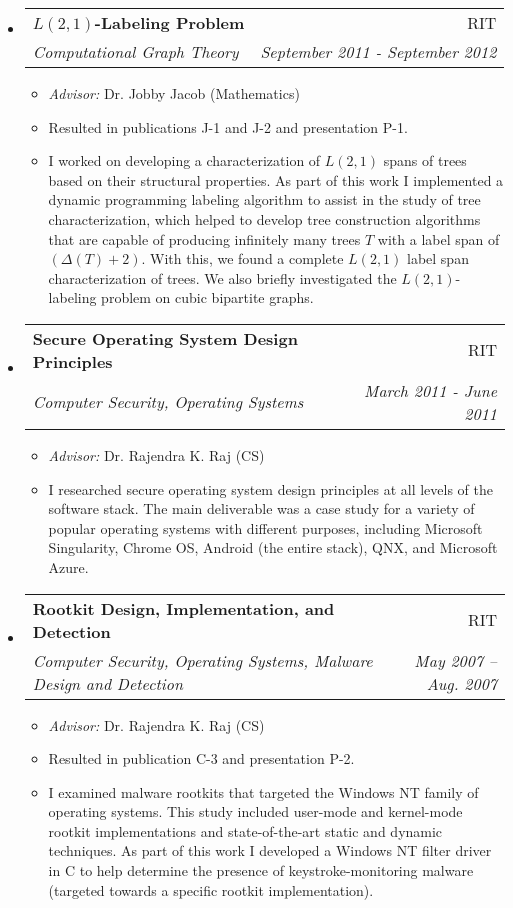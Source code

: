 \documentclass[letterpaper,11pt]{article}
\makeatletter
\newcommand{\resitem}[1]{\item #1 \vspace{-2pt}}
\newcommand{\ressubheading}[4]{
\begin{tabular*}{6.5in}[t]{l@{\cftdotfill{\cftsecdotsep}\extracolsep{\fill}}r}
		\textbf{#1} & #2 \\
		\textit{#3} & \textit{#4} \\
\end{tabular*}\vspace{-6pt}}
\makeatother
\begin{document}
\begin{itemize}
\item
	\ressubheading{$L(2,1)$-Labeling Problem}{RIT}{Computational Graph Theory}{September 2011 - September 2012}
	\begin{itemize}
		\resitem{\emph{Advisor:} Dr. Jobby Jacob (Mathematics)}
		\resitem{Resulted in publications J-1 and J-2 and presentation P-1.}
		\resitem{I worked on developing a characterization of $L(2,1)$ spans of trees based on their structural properties. As part of this work I implemented a dynamic programming labeling algorithm to assist in the study of tree characterization, which helped to develop tree construction algorithms that are capable of producing infinitely many trees $T$ with a label span of $(\Delta(T) + 2)$. With this, we found a complete $L(2,1)$ label span characterization of trees. We also briefly investigated the $L(2,1)$-labeling problem on cubic bipartite graphs.}
	\end{itemize}

\item
	\ressubheading{Secure Operating System Design Principles}{RIT}{Computer Security, Operating Systems}{March 2011 - June 2011}
	\begin{itemize}
		\resitem{\emph{Advisor:} Dr. Rajendra K. Raj (CS)}
		\resitem{I researched secure operating system design principles at all levels of the software stack. The main deliverable was a case study for a variety of popular operating systems with different purposes, including Microsoft Singularity, Chrome OS, Android (the entire stack), QNX, and Microsoft Azure.}
	\end{itemize}

\item
	\ressubheading{Rootkit Design, Implementation, and Detection}{RIT}{Computer Security, Operating Systems, Malware Design and Detection}{May 2007 -- Aug. 2007}
	\begin{itemize}
		\resitem{\emph{Advisor:} Dr. Rajendra K. Raj (CS)}
		\resitem{Resulted in publication C-3 and presentation P-2.}
		\resitem{I examined malware rootkits that targeted the Windows NT family of operating systems. This study included user-mode and kernel-mode rootkit implementations and state-of-the-art static and dynamic techniques. As part of this work I developed a Windows NT filter driver in C to help determine the presence of keystroke-monitoring malware (targeted towards a specific rootkit implementation).}
	\end{itemize}

\end{itemize}
\vspace*{-16pt}
\end{document}
